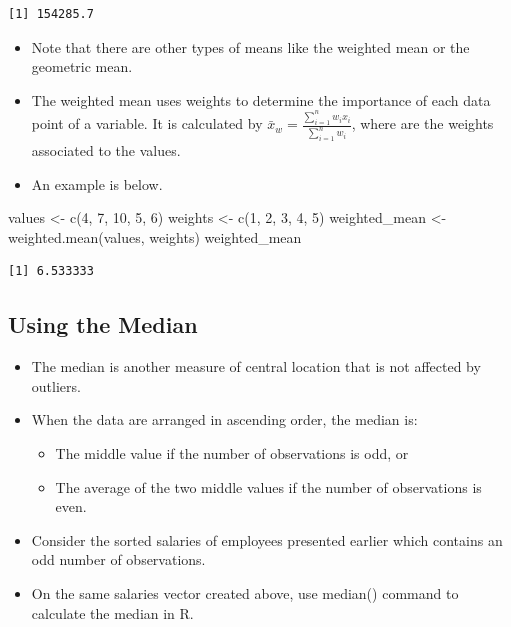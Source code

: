 \documentclass[
  letterpaper,
  DIV=11,
  numbers=noendperiod]{scrreprt}
\newenvironment{Shaded}{\begin{snugshade}}{\end{snugshade}}
\newcommand{\DecValTok}[1]{\textcolor[rgb]{0.68,0.00,0.00}{#1}}
\newcommand{\FunctionTok}[1]{\textcolor[rgb]{0.28,0.35,0.67}{#1}}
\newcommand{\NormalTok}[1]{\textcolor[rgb]{0.00,0.23,0.31}{#1}}
\newcommand{\OtherTok}[1]{\textcolor[rgb]{0.00,0.23,0.31}{#1}}
\providecommand{\tightlist}{%
  \setlength{\itemsep}{0pt}\setlength{\parskip}{0pt}}\usepackage{longtable,booktabs,array}
\begin{document}
\begin{verbatim}
[1] 154285.7
\end{verbatim}

\begin{itemize}
\tightlist
\item
  Note that there are other types of means like the weighted mean or the
  geometric mean.\\
\item
  The weighted mean uses weights to determine the importance of each
  data point of a variable. It is calculated by
  \(\bar{x}_w = \frac{\sum_{i=1}^{n} w_i x_i}{\sum_{i=1}^{n} w_i}\),
  where are the weights associated to the values.
\item
  An example is below.
\end{itemize}

\begin{Shaded}
\begin{Highlighting}[]
\NormalTok{values }\OtherTok{\textless{}{-}} \FunctionTok{c}\NormalTok{(}\DecValTok{4}\NormalTok{, }\DecValTok{7}\NormalTok{, }\DecValTok{10}\NormalTok{, }\DecValTok{5}\NormalTok{, }\DecValTok{6}\NormalTok{)}
\NormalTok{weights }\OtherTok{\textless{}{-}} \FunctionTok{c}\NormalTok{(}\DecValTok{1}\NormalTok{, }\DecValTok{2}\NormalTok{, }\DecValTok{3}\NormalTok{, }\DecValTok{4}\NormalTok{, }\DecValTok{5}\NormalTok{)}
\NormalTok{weighted\_mean }\OtherTok{\textless{}{-}} \FunctionTok{weighted.mean}\NormalTok{(values, weights)}
\NormalTok{weighted\_mean}
\end{Highlighting}
\end{Shaded}

\begin{verbatim}
[1] 6.533333
\end{verbatim}

\subsection{Using the Median}\label{using-the-median}

\begin{itemize}
\tightlist
\item
  The median is another measure of central location that is not affected
  by outliers.
\item
  When the data are arranged in ascending order, the median is:

  \begin{itemize}
  \tightlist
  \item
    The middle value if the number of observations is odd, or
  \item
    The average of the two middle values if the number of observations
    is even.
  \end{itemize}
\item
  Consider the sorted salaries of employees presented earlier which
  contains an odd number of observations.\\
\item
  On the same salaries vector created above, use median() command to
  calculate the median in R.
\end{itemize}
\end{document}
